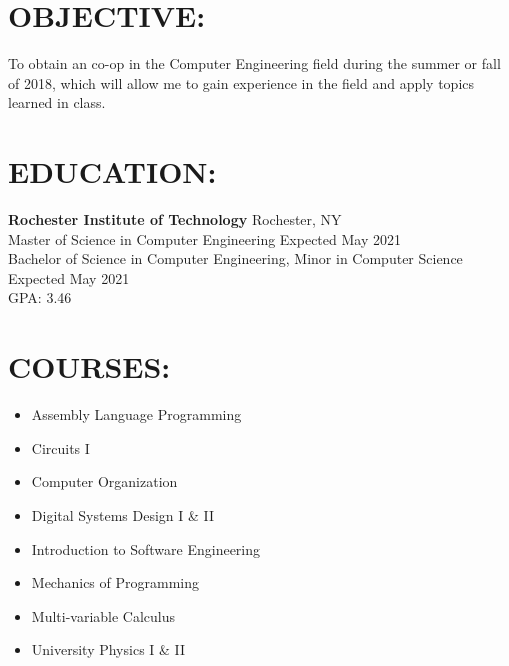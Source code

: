 \documentclass[line,margin]{res}
\begin{document}
\setlength\columnsep{-30pt}
\email{} %
\phone{} %
\address{} %
\address{} %
\website{} %
 
\begin{resume}
 \setlength
 \multicolsep{2pt}

\section{OBJECTIVE:} %
	To obtain an co-op in the Computer Engineering field during the summer or fall of 2018, which will allow me to gain experience in the field and apply topics learned in class.

\section{EDUCATION:} 
	\textbf{Rochester Institute of Technology} \hfill Rochester, NY \\
	Master of Science in Computer Engineering \hfill Expected May 2021 \\
	Bachelor of Science in Computer Engineering, Minor in Computer Science \hfill Expected May 2021\\ 
	GPA: 3.46

\section{COURSES:}
		\begin{multicols}{2}
		\setlength\columnsep{1pt}
			\begin{itemize}
				\setlength{\itemindent}{-25pt}
				\item[] Assembly Language Programming
				\item[] Circuits I
				\item[] Computer Organization
				\item[] Digital Systems Design I \& II
				\item[] \hspace{12.5pt} Introduction to Software Engineering
				\item[] \hspace{12.5pt} Mechanics of Programming
				\item[] \hspace{12.5pt} Multi-variable Calculus
				\item[] \hspace{12.5pt} University Physics I \& II
			\end{itemize}
		\end{multicols}


\end{resume}
\end{document}
